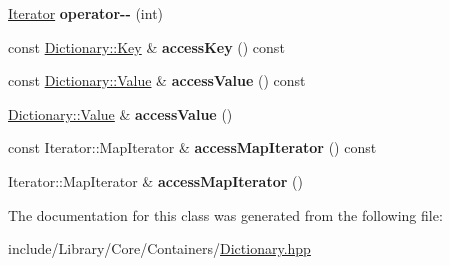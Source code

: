 \begin{DoxyCompactItemize}
\item 
\mbox{\label{classlibrary_1_1core_1_1ctnr_1_1_dictionary_1_1_iterator_a0e6049d9ccc80f1b0775cd5a3aff1983}} 
\hyperlink{classlibrary_1_1core_1_1ctnr_1_1_dictionary_1_1_iterator}{Iterator} {\bfseries operator-\/-\/} (int)
\item 
\mbox{\label{classlibrary_1_1core_1_1ctnr_1_1_dictionary_1_1_iterator_aa2d6a49d852730a914282aacbab8462d}} 
const \hyperlink{classlibrary_1_1core_1_1types_1_1_string}{Dictionary\+::\+Key} \& {\bfseries access\+Key} () const
\item 
\mbox{\label{classlibrary_1_1core_1_1ctnr_1_1_dictionary_1_1_iterator_af81ea86e2febbe6ca73e502987de33a1}} 
const \hyperlink{classlibrary_1_1core_1_1ctnr_1_1_object}{Dictionary\+::\+Value} \& {\bfseries access\+Value} () const
\item 
\mbox{\label{classlibrary_1_1core_1_1ctnr_1_1_dictionary_1_1_iterator_a7ef51bee5765a7b2464121552ac2ecfe}} 
\hyperlink{classlibrary_1_1core_1_1ctnr_1_1_object}{Dictionary\+::\+Value} \& {\bfseries access\+Value} ()
\item 
\mbox{\label{classlibrary_1_1core_1_1ctnr_1_1_dictionary_1_1_iterator_a202f6a93a302e94078a33c1bcc999deb}} 
const Iterator\+::\+Map\+Iterator \& {\bfseries access\+Map\+Iterator} () const
\item 
\mbox{\label{classlibrary_1_1core_1_1ctnr_1_1_dictionary_1_1_iterator_acbc6831522ba983453d99696b58e055c}} 
Iterator\+::\+Map\+Iterator \& {\bfseries access\+Map\+Iterator} ()
\end{DoxyCompactItemize}


The documentation for this class was generated from the following file\+:\begin{DoxyCompactItemize}
\item 
include/\+Library/\+Core/\+Containers/\hyperlink{_dictionary_8hpp}{Dictionary.\+hpp}\end{DoxyCompactItemize}
